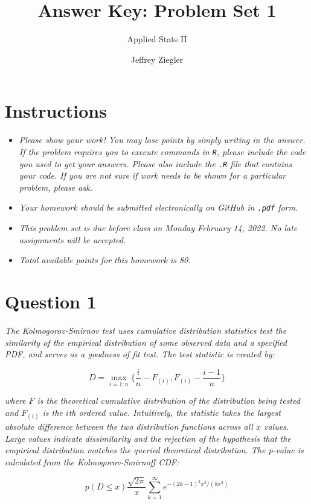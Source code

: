 \documentclass[12pt,letterpaper]{article}
\title{Answer Key: Problem Set 1}
\date{Jeffrey Ziegler}
\author{Applied Stats II}
\begin{document}
	\maketitle
	
	\section*{Instructions}
	\begin{itemize}
		\item \textit{Please show your work! You may lose points by simply writing in the answer. If the problem requires you to execute commands in \texttt{R}, please include the code you used to get your answers. Please also include the \texttt{.R} file that contains your code. If you are not sure if work needs to be shown for a particular problem, please ask.}
		\item \textit{Your homework should be submitted electronically on GitHub in \texttt{.pdf} form.}
		\item \textit{This problem set is due before class on Monday February 14, 2022. No late assignments will be accepted.}
		\item \textit{Total available points for this homework is 80.}
	\end{itemize}
	\vspace{.25cm}
	
	\section*{Question 1}
	\vspace{.25cm}
	\noindent \emph{The Kolmogorov-Smirnov test uses cumulative distribution statistics test the similarity of the empirical distribution of some observed data and a specified PDF, and serves as a goodness of fit test. The test statistic is created by:}
	
	$$D = \max_{i=1:n} \Big\{ \frac{i}{n}  - F_{(i)}, F_{(i)} - \frac{i-1}{n} \Big\}$$
	
	\noindent \emph{where $F$ is the theoretical cumulative distribution of the distribution being tested and $F_{(i)}$ is the $i$th ordered value. Intuitively, the statistic takes the largest absolute difference between the two distribution functions across all $x$ values. Large values indicate dissimilarity and the rejection of the hypothesis that the empirical distribution matches the queried theoretical distribution. The p-value is calculated from the Kolmogorov-Smirnoff CDF:}
	
	$$p(D \leq x) \frac{\sqrt {2\pi}}{x} \sum _{k=1}^{\infty }e^{-(2k-1)^{2}\pi ^{2}/(8x^{2})}$$
	
\end{document}
